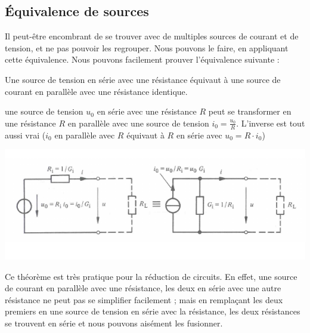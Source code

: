 \documentclass[12pt,a4paper]{article}
\begin{document}
\subsection{Équivalence de sources}
Il peut-être encombrant de se trouver avec de multiples sources de courant et de tension, et ne pas pouvoir les regrouper. Nous pouvons le faire, en appliquant cette équivalence. Nous pouvons facilement prouver l'équivalence suivante : 
\begin{boite}
	Une source de tension en série avec une résistance équivaut à une source de courant en parallèle avec une résistance identique.
\end{boite}
\begin{exemple}
	une source de tension $u_0$ en série avec une résistance $R$ peut se transformer en une résistance $R$ en parallèle avec une source de tension $i_0 = \frac{u_0}{R}$. L'inverse est tout aussi vrai ($i_0$ en parallèle avec $R$ équivaut à $R$ en série avec $u_0 = R\cdot i_0$)
	\begin{center}
		\includegraphics[scale=0.73]{images/equivalence_source}
	\end{center}
\end{exemple} 
Ce théorème est très pratique pour la réduction de circuits. En effet, une source de courant en parallèle avec une résistance, les deux en série avec une autre résistance ne peut pas se simplifier facilement ; mais en remplaçant les deux premiers en une source de tension en série avec la résistance, les deux résistances se trouvent en série et nous pouvons aisément les fusionner.
\end{document}
